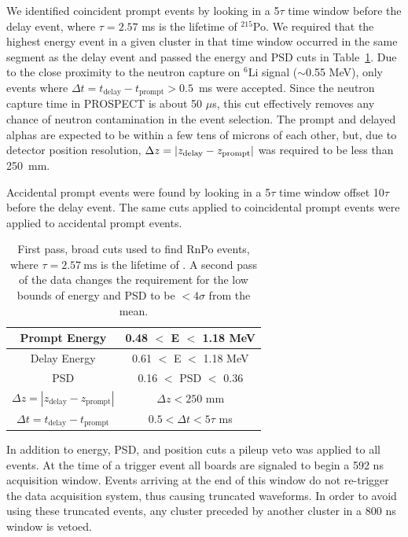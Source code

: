 We identified coincident prompt events by looking in a 5$\tau$ time window before the delay event, where $\tau = 2.57$ ms is the lifetime of $^{215}$Po.
We required that the highest energy event in a given cluster in that time window occurred in the same segment as the delay event and passed the energy and PSD cuts in Table~\ref{tab:RnPoCuts}.
Due to the close proximity to the neutron capture on $^6$Li signal ($\sim$0.55 MeV), only events where $\Delta t = t_{\textrm{delay}}-t_{\textrm{prompt}} > 0.5$~ms were accepted.
Since the neutron capture time in PROSPECT is about 50 $\mu$s, this cut effectively removes any chance of neutron contamination in the event selection.
The prompt and delayed alphas are expected to be within a few tens of microns of each other, but, due to detector position resolution, $\Delta z = \abs{z_{\textrm{delay}} - z_{\textrm{prompt}}}$ was required to be less than 250~mm.

Accidental prompt events were found by looking in a 5$\tau$ time window offset 10$\tau$ before the delay event. 
The same cuts applied to coincidental prompt events were applied to accidental prompt events.

\begin{table}[!t]
	\centering
\begin{tabular}{c|c}
	\hline 
	Prompt Energy & 0.48 $<$ E $<$ 1.18 MeV \\ 
	\hline 
	Delay Energy & 0.61 $<$ E $<$ 1.18 MeV \\ 
	\hline 
	PSD & 0.16 $<$ PSD $<$ 0.36 \\ 
	\hline 
	$\Delta z = |z_{\textrm{delay}} - z_{\textrm{prompt}}|$ & $\Delta z < 250$ mm  \\ 
	\hline 
	$\Delta t = t_{\textrm{delay}} - t_{\textrm{prompt}}$ & $0.5 < \Delta t < 5\tau$ ms \\ 
	\hline 
\end{tabular} 
\caption{First pass, broad cuts used to find RnPo events, where $\tau = 2.57~\textrm{ms}$ is the lifetime of \Po. A second pass of the data changes the requirement for the low bounds of energy and PSD to be $< 4 \sigma$ from the mean.}
\label{tab:RnPoCuts}
\end{table}

In addition to energy, PSD, and position cuts a pileup veto was applied to all events.
At the time of a trigger event all boards are signaled to begin a 592 ns acquisition window. 
Events arriving at the end of this window do not re-trigger the data acquisition system, thus causing truncated waveforms.
In order to avoid using these truncated events, any cluster preceded by another cluster in a 800 ns window is vetoed. 


